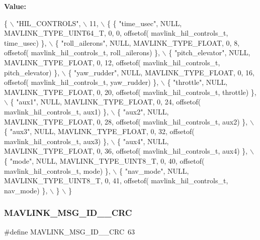 {\bfseries Value\+:}
\begin{DoxyCode}
\{ \(\backslash\)
    \textcolor{stringliteral}{"HIL\_CONTROLS"}, \(\backslash\)
    11, \(\backslash\)
    \{  \{ \textcolor{stringliteral}{"time\_usec"}, NULL, MAVLINK_TYPE_UINT64_T, 0, 0, offsetof(
      mavlink_hil_controls_t, time\_usec) \}, \(\backslash\)
         \{ \textcolor{stringliteral}{"roll\_ailerons"}, NULL, MAVLINK_TYPE_FLOAT, 0, 8, offsetof(
      mavlink_hil_controls_t, roll\_ailerons) \}, \(\backslash\)
         \{ \textcolor{stringliteral}{"pitch\_elevator"}, NULL, MAVLINK_TYPE_FLOAT, 0, 12, offsetof(
      mavlink_hil_controls_t, pitch\_elevator) \}, \(\backslash\)
         \{ \textcolor{stringliteral}{"yaw\_rudder"}, NULL, MAVLINK_TYPE_FLOAT, 0, 16, offsetof(
      mavlink_hil_controls_t, yaw\_rudder) \}, \(\backslash\)
         \{ \textcolor{stringliteral}{"throttle"}, NULL, MAVLINK_TYPE_FLOAT, 0, 20, offsetof(
      mavlink_hil_controls_t, throttle) \}, \(\backslash\)
         \{ \textcolor{stringliteral}{"aux1"}, NULL, MAVLINK_TYPE_FLOAT, 0, 24, offsetof(
      mavlink_hil_controls_t, aux1) \}, \(\backslash\)
         \{ \textcolor{stringliteral}{"aux2"}, NULL, MAVLINK_TYPE_FLOAT, 0, 28, offsetof(
      mavlink_hil_controls_t, aux2) \}, \(\backslash\)
         \{ \textcolor{stringliteral}{"aux3"}, NULL, MAVLINK_TYPE_FLOAT, 0, 32, offsetof(
      mavlink_hil_controls_t, aux3) \}, \(\backslash\)
         \{ \textcolor{stringliteral}{"aux4"}, NULL, MAVLINK_TYPE_FLOAT, 0, 36, offsetof(
      mavlink_hil_controls_t, aux4) \}, \(\backslash\)
         \{ \textcolor{stringliteral}{"mode"}, NULL, MAVLINK_TYPE_UINT8_T, 0, 40, offsetof(
      mavlink_hil_controls_t, mode) \}, \(\backslash\)
         \{ \textcolor{stringliteral}{"nav\_mode"}, NULL, MAVLINK_TYPE_UINT8_T, 0, 41, offsetof(
      mavlink_hil_controls_t, nav\_mode) \}, \(\backslash\)
         \} \(\backslash\)
\}
\end{DoxyCode}
\mbox{\label{mavlink__msg__hil__controls_8h_af2ab22ddc6899970c4df7746f3f45915}} 
\subsubsection{M\+A\+V\+L\+I\+N\+K\+\_\+\+M\+S\+G\+\_\+\+I\+D\+\_\+\_\+\+C\+RC}
{\footnotesize\ttfamily \#define M\+A\+V\+L\+I\+N\+K\+\_\+\+M\+S\+G\+\_\+\+I\+D\+\_\+\_\+\+C\+RC~63}

